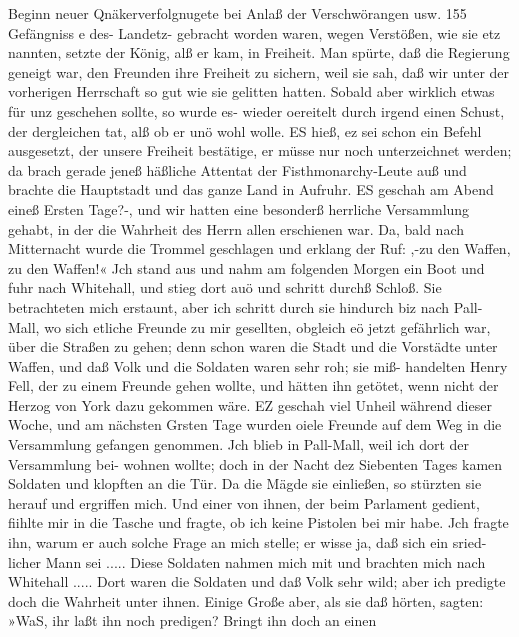 
Beginn neuer Qnäkerverfolgnugete bei Anlaß der Verschwörangen usw. 155
Gefängniss e des- Landetz- gebracht worden waren, wegen Verstößen,
wie sie etz nannten, setzte der König, alß er kam, in Freiheit.
Man spürte, daß die Regierung geneigt war, den Freunden ihre
Freiheit zu sichern, weil sie sah, daß wir unter der vorherigen
Herrschaft so gut wie sie gelitten hatten. Sobald aber wirklich
etwas für unz geschehen sollte, so wurde es- wieder oereitelt durch
irgend einen Schust, der dergleichen tat, alß ob er unö wohl
wolle. ES hieß, ez sei schon ein Befehl ausgesetzt, der unsere
Freiheit bestätige, er müsse nur noch unterzeichnet werden; da
brach gerade jeneß häßliche Attentat der Fisthmonarchy-Leute
auß und brachte die Hauptstadt und das ganze Land in Aufruhr.
ES geschah am Abend eineß Ersten Tage?-, und wir hatten eine
besonderß herrliche Versammlung gehabt, in der die Wahrheit
des Herrn allen erschienen war. Da, bald nach Mitternacht wurde
die Trommel geschlagen und erklang der Ruf: ,-zu den Waffen,
zu den Waffen!« Jch stand aus und nahm am folgenden Morgen
ein Boot und fuhr nach Whitehall, und stieg dort auö und schritt
durchß Schloß. Sie betrachteten mich erstaunt, aber ich schritt
durch sie hindurch biz nach Pall-Mall, wo sich etliche Freunde
zu mir gesellten, obgleich eö jetzt gefährlich war, über die Straßen
zu gehen; denn schon waren die Stadt und die Vorstädte unter
Waffen, und daß Volk und die Soldaten waren sehr roh; sie miß-
handelten Henry Fell, der zu einem Freunde gehen wollte, und
hätten ihn getötet, wenn nicht der Herzog von York dazu gekommen
wäre. EZ geschah viel Unheil während dieser Woche, und am
nächsten Grsten Tage wurden oiele Freunde auf dem Weg in die
Versammlung gefangen genommen.
Jch blieb in Pall-Mall, weil ich dort der Versammlung bei-
wohnen wollte; doch in der Nacht dez Siebenten Tages kamen
Soldaten und klopften an die Tür. Da die Mägde sie einließen,
so stürzten sie herauf und ergriffen mich. Und einer von ihnen,
der beim Parlament gedient, fiihlte mir in die Tasche und fragte,
ob ich keine Pistolen bei mir habe. Jch fragte ihn, warum er
auch solche Frage an mich stelle; er wisse ja, daß sich ein sried-
licher Mann sei ..... Diese Soldaten nahmen mich mit und
brachten mich nach Whitehall ..... Dort waren die Soldaten
und daß Volk sehr wild; aber ich predigte doch die Wahrheit
unter ihnen. Einige Große aber, als sie daß hörten, sagten:
»WaS, ihr laßt ihn noch predigen? Bringt ihn doch an einen


